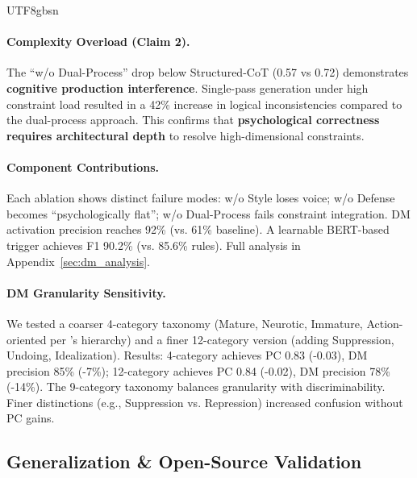 \documentclass[11pt]{article}
\begin{document}
\begin{CJK*}{UTF8}{gbsn}
\paragraph{Complexity Overload (Claim 2).} The ``w/o Dual-Process'' drop below Structured-CoT (0.57 vs 0.72) demonstrates \textbf{cognitive production interference}. Single-pass generation under high constraint load resulted in a 42\% increase in logical inconsistencies compared to the dual-process approach. This confirms that \textbf{psychological correctness requires architectural depth} to resolve high-dimensional constraints.

\paragraph{Component Contributions.} Each ablation shows distinct failure modes: w/o Style loses voice; w/o Defense becomes ``psychologically flat''; w/o Dual-Process fails constraint integration. DM activation precision reaches 92\% (vs. 61\% baseline). A learnable BERT-based trigger achieves F1 90.2\% (vs. 85.6\% rules). Full analysis in Appendix~\ref{sec:dm_analysis}.

\paragraph{DM Granularity Sensitivity.} We tested a coarser 4-category taxonomy (Mature, Neurotic, Immature, Action-oriented per \citet{vaillant1994ego}'s hierarchy) and a finer 12-category version (adding Suppression, Undoing, Idealization). Results: 4-category achieves PC 0.83 (-0.03), DM precision 85\% (-7\%); 12-category achieves PC 0.84 (-0.02), DM precision 78\% (-14\%). The 9-category taxonomy balances granularity with discriminability. Finer distinctions (e.g., Suppression vs. Repression) increased confusion without PC gains.

\subsection{Generalization \& Open-Source Validation}
\label{sec:generalization}
\label{sec:opensource_pipeline}

\begin{table}[h]
\centering
\scriptsize
{}
\caption{Open-source pipeline. PersonaForge runs on open models with moderate degradation.}
\label{tab:open_pipeline}
\end{table}


\end{CJK*}
\end{document}

